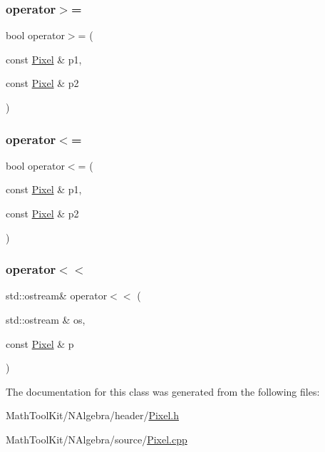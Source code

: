 \mbox{\label{class_pixel_a9564c5098775053d65c9f052b9281388}} 
\subsubsection{\texorpdfstring{operator$>$=}{operator>=}}
{\footnotesize\ttfamily bool operator$>$= (\begin{DoxyParamCaption}\item[{const \mbox{\hyperlink{class_pixel}{Pixel}} \&}]{p1,  }\item[{const \mbox{\hyperlink{class_pixel}{Pixel}} \&}]{p2 }\end{DoxyParamCaption})\hspace{0.3cm}{\ttfamily [friend]}}

\mbox{\label{class_pixel_a8e1356c4b2066282783d0c03526bd34f}} 
\subsubsection{\texorpdfstring{operator$<$=}{operator<=}}
{\footnotesize\ttfamily bool operator$<$= (\begin{DoxyParamCaption}\item[{const \mbox{\hyperlink{class_pixel}{Pixel}} \&}]{p1,  }\item[{const \mbox{\hyperlink{class_pixel}{Pixel}} \&}]{p2 }\end{DoxyParamCaption})\hspace{0.3cm}{\ttfamily [friend]}}

\mbox{\label{class_pixel_af9850b2e5c78fc7f7e841c490713168e}} 
\subsubsection{\texorpdfstring{operator$<$$<$}{operator<<}}
{\footnotesize\ttfamily std\+::ostream\& operator$<$$<$ (\begin{DoxyParamCaption}\item[{std\+::ostream \&}]{os,  }\item[{const \mbox{\hyperlink{class_pixel}{Pixel}} \&}]{p }\end{DoxyParamCaption})\hspace{0.3cm}{\ttfamily [friend]}}



The documentation for this class was generated from the following files\+:\begin{DoxyCompactItemize}
\item 
Math\+Tool\+Kit/\+N\+Algebra/header/\mbox{\hyperlink{_pixel_8h}{Pixel.\+h}}\item 
Math\+Tool\+Kit/\+N\+Algebra/source/\mbox{\hyperlink{_pixel_8cpp}{Pixel.\+cpp}}\end{DoxyCompactItemize}
